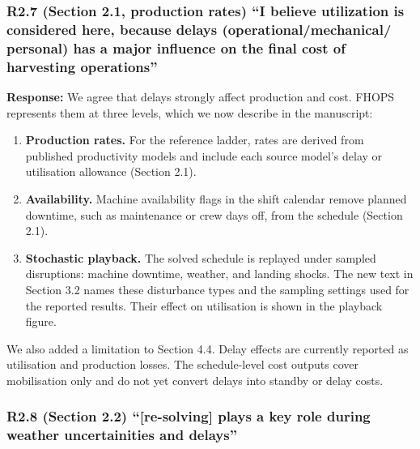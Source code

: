 \subsubsection{R2.7 (Section 2.1, production rates) ``I believe
utilization is considered here, because delays (operational/mechanical/
personal) has a major influence on the final cost of harvesting
operations''}\label{r2.7-section-2.1-production-rates-i-believe-utilization-is-considered-here-because-delays-operationalmechanical-personal-has-a-major-influence-on-the-final-cost-of-harvesting-operations}

\textbf{Response:} We agree that delays strongly affect production and
cost. FHOPS represents them at three levels, which we now describe in
the manuscript:

\begin{enumerate}
\def\labelenumi{\arabic{enumi}.}
\tightlist
\item
  \textbf{Production rates.} For the reference ladder, rates are derived
  from published productivity models and include each source model's
  delay or utilisation allowance (Section 2.1).
\item
  \textbf{Availability.} Machine availability flags in the shift
  calendar remove planned downtime, such as maintenance or crew days
  off, from the schedule (Section 2.1).
\item
  \textbf{Stochastic playback.} The solved schedule is replayed under
  sampled disruptions: machine downtime, weather, and landing shocks.
  The new text in Section 3.2 names these disturbance types and the
  sampling settings used for the reported results. Their effect on
  utilisation is shown in the playback figure.
\end{enumerate}

We also added a limitation to Section 4.4. Delay effects are currently
reported as utilisation and production losses. The schedule-level cost
outputs cover mobilisation only and do not yet convert delays into
standby or delay costs.

\subsubsection{R2.8 (Section 2.2) ``{[}re-solving{]} plays a key role
during weather uncertainities and
delays''}\label{r2.8-section-2.2-re-solving-plays-a-key-role-during-weather-uncertainities-and-delays}

